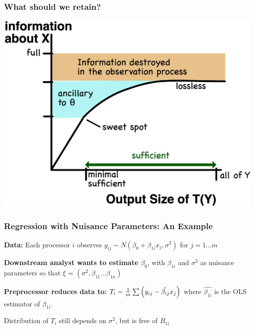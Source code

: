 \documentclass[10pt, compress]{beamer}
\begin{document}
\begin{frame}[fragile]
    \frametitle{What should we retain?}
    \includegraphics[width=\textwidth]{assets/information.eps}
\end{frame}


\begin{frame}[fragile]

    \frametitle{Regression with Nuisance Parameters: An Example}
    
    \vspace*{5mm}
    
    \textbf{Data:} Each processor $i$ observes $y_{ij} \sim N(\beta_0 + \beta_{1i}x_j, \sigma^2)$ for $j = 1 \ldots m$
    
    \vspace*{2mm}

    \textbf{Downstream analyst wants to estimate $\beta_0$}, with $\beta_{1i}$ and $\sigma^2$ as nuisance parameters so that $\xi$ = $(\sigma^2, \beta_{11} \ldots \beta_{1n})$
    
    \vspace*{2mm}

    \textbf{Preprocessor reduces data to:} $T_i = \frac{1}{m}\sum\del{y_{ij} - \hat{\beta_{ij}}x_j}$ where $\hat{\beta_{1i}}$ is the OLS estimator of $\beta_{1i}$.
    
    \vspace*{5mm}
    
    Distribution of $T_i$ still depends on $\sigma^2$, but is free of $B_{1i}$ 
\end{frame}
\end{document}
